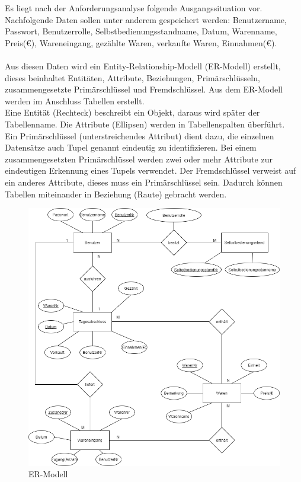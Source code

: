 Es liegt nach der Anforderungsanalyse folgende Ausgangssituation vor. Nachfolgende Daten sollen unter anderem gespeichert werden:
Benutzername, Passwort, Benutzerrolle, Selbstbedienungsstandname, Datum, Warenname, Preis(€), Wareneingang, gezählte Waren, verkaufte Waren, Einnahmen(€).
\\
\\
Aus diesen Daten wird ein Entity-Relationship-Modell (ER-Modell) erstellt, dieses beinhaltet Entitäten, Attribute, Beziehungen, Primärschlüsseln, zusammengesetzte Primärschlüssel und Fremdschlüssel.
Aus dem ER-Modell werden im Anschluss Tabellen erstellt.
\\
Eine Entität (Rechteck) beschreibt ein Objekt, daraus wird später der Tabellenname. Die Attribute (Ellipsen) werden in Tabellenspalten überführt.
\\
Ein Primärschlüssel (unterstreichendes Attribut) dient dazu, die einzelnen Datensätze auch Tupel genannt eindeutig zu identifizieren.
Bei einem zusammengesetzten Primärschlüssel werden zwei oder mehr Attribute zur eindeutigen Erkennung eines Tupels verwendet.
Der Fremdschlüssel verweist auf ein anderes Attribute, dieses muss ein Primärschlüssel sein. Dadurch können Tabellen miteinander in Beziehung (Raute) gebracht werden.

\begin{figure}[htb]
	\centering
	\includegraphics[width=1\textwidth,angle=0]{abb/ER-Modell}
	\caption[ER-Modell]{ER-Modell}
	\label{fig:ER Modell}
\end{figure}



